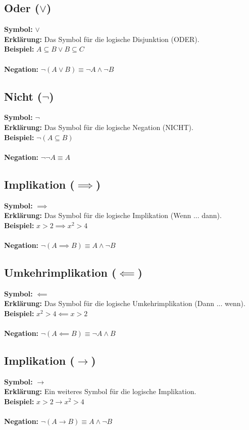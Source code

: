 \documentclass[12pt,a4paper]{article}
\begin{document}
\subsection{Oder (\texorpdfstring{$\lor$}{lor})}
\textbf{Symbol:} $\lor$ \\
\textbf{Erklärung:} Das Symbol für die logische Disjunktion (ODER). \\
\textbf{Beispiel:} $A \subseteq B \lor B \subseteq C$ \\ \\
\textbf{Negation:} $\neg (A \lor B) \equiv \neg A \land \neg B$

\subsection{Nicht (\texorpdfstring{$\neg$}{neg})}
\textbf{Symbol:} $\neg$ \\
\textbf{Erklärung:} Das Symbol für die logische Negation (NICHT). \\
\textbf{Beispiel:} $\neg (A \subseteq B)$ \\ \\
\textbf{Negation:} $\neg \neg A \equiv A$

\subsection{Implikation (\texorpdfstring{$\implies$}{implies})}
\textbf{Symbol:} $\implies$ \\
\textbf{Erklärung:} Das Symbol für die logische Implikation (Wenn ... dann). \\
\textbf{Beispiel:} $x > 2 \implies x^2 > 4$ \\ \\
\textbf{Negation:} $\neg (A \implies B) \equiv A \land \neg B$

\subsection{Umkehrimplikation (\texorpdfstring{$\impliedby$}{impliedby})}
\textbf{Symbol:} $\impliedby$ \\
\textbf{Erklärung:} Das Symbol für die logische Umkehrimplikation (Dann ... wenn). \\
\textbf{Beispiel:} $x^2 > 4 \impliedby x > 2$ \\ \\
\textbf{Negation:} $\neg (A \impliedby B) \equiv \neg A \land B$

\subsection{Implikation (\texorpdfstring{$\rightarrow$}{rightarrow})}
\textbf{Symbol:} $\rightarrow$ \\
\textbf{Erklärung:} Ein weiteres Symbol für die logische Implikation. \\
\textbf{Beispiel:} $x > 2 \rightarrow x^2 > 4$ \\ \\
\textbf{Negation:} $\neg (A \rightarrow B) \equiv A \land \neg B$
\end{document}
